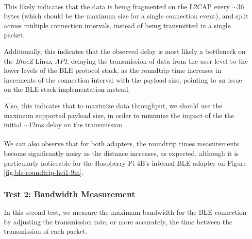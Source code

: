 \paragraph{} This likely indicates that the data is being fragmented on the \acs{L2CAP} every $\sim$36 bytes (which should be the maximum size for a single connection event), and split across multiple connection intervals, instead of being transmitted in a single packet. 

Additionally, this indicates that the observed delay is most likely a bottleneck on the \textit{BlueZ} Linux \textit{API}, delaying the transmission of data from the user level to the lower levels of the \acs{BLE} protocol stack, as the roundtrip time increases in increments of the connection interval with the payload size, pointing to an issue on the \acs{BLE} stack implementation instead.

Also, this indicates that to maximize data throughput, we should use the maximum supported payload size, in order to minimize the impact of the the initial $\sim$12ms delay on the transmission.
 
\paragraph{} We can also observe that for both adapters, the roundtrip times measurements become significantly noisy as the distance increases, as expected, although it is particularly noticeable for the Raspberry Pi 4B's internal \acs{BLE} adapter on Figure \ref{fig:ble-roundtrip-hci1-9m}. 

\paragraph{} 

\subsubsection{Test 2: Bandwidth Measurement}

In this second test, we measure the maximum bandwidth for the \acs{BLE} connection by adjusting the transmission rate, or more accurately, the time between the transmission of each packet. 

